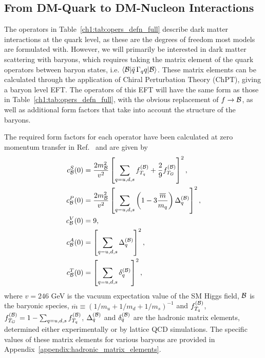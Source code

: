 \subsection{From DM-Quark to DM-Nucleon Interactions}
\label{ch1:subsec:quark_to_nucleon_EFT}

The operators in Table~\ref{ch1:tab:opers_defn_full} describe dark matter interactions at the quark level, as these are the degrees of freedom most models are formulated with. However, we will primarily be interested in dark matter scattering with baryons, which requires taking the matrix element of the quark operators between baryon states, i.e. $\langle {\cal B} | \bar q \, \Gamma_q q| {\cal B}\rangle$. These matrix elements can be calculated through the application of Chiral Perturbation Theory (ChPT), giving a baryon level EFT. The operators of this EFT will have the same form as those in Table~\ref{ch1:tab:opers_defn_full}, with the obvious replacement of $f\rightarrow \cal B$, as well as additional form factors that take into account the structure of the baryons.

The required form factors for each operator have been calculated at zero momentum transfer in Ref.~\cite{Cirelli:2013ufw_oct_Toolsmodelindependentbounds} and are given by 
\begin{align}
c_{\cal B}^S(0) &= \frac{2 m_{\cal B}^2}{v^2}\left[\sum_{q=u,d,s}f_{T_q}^{(\cal B)}+\frac{2}{9}f_{T_G}^{(\cal B)}\right]^2,\label{ch1:eq:cBS}\\
c_{\cal B}^P(0) &= \frac{2 m_{\cal B}^2}{v^2}\left[\sum_{q=u,d,s}\left(1-3\frac{\overline{m}}{m_q}\right)\Delta_q^{(\cal B)}\right]^2,\label{ch1:eq:cBP}\\
c_{\cal B}^V(0) &= 9,\label{ch1:eq:cBV}\\
c_{\cal B}^A(0) &=  \left[\sum_{q=u,d,s}\Delta_q^{(\cal B)}\right]^2,\label{ch1:eq:cBA}\\
c_{\cal B}^T(0) &= \left[\sum_{q=u,d,s}\delta_q^{(\cal B)}\right]^2,\label{ch1:eq:cBT}
\end{align}
where  $v=246$ GeV is the vacuum expectation value of the SM Higgs field, $\cal B$ is the baryonic species,  $\overline{m}\equiv(1/m_u+1/m_d+1/m_s)^{-1}$ and $f_{T_q}^{(\cal B)}$, $f_{T_G}^{(\cal B)}=1-\sum_{q=u,d,s} f_{T_q}^{(\cal B)}$, $\Delta_q^{(\cal B)}$ and $\delta_q^{(\cal B)}$ are the hadronic matrix elements, determined either experimentally or by lattice QCD simulations. The specific values of these matrix elements for various baryons are provided in Appendix~\ref{appendix:hadronic_matrix_elements}.


